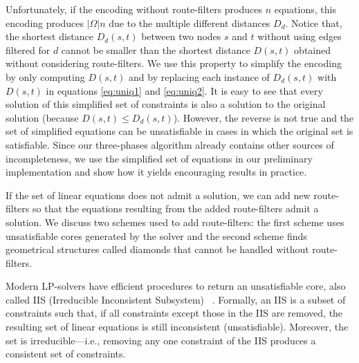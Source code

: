 Unfortunately, if the encoding without route-filters produces $n$ equations, this encoding produces $|\Omega|n$ due
to the multiple different distances $D_d$.
Notice that, the shortest distance $D_d(s,t)$ between two nodes $s$ and $t$ without using edges filtered for $d$ cannot be
smaller than the shortest distance $D(s,t)$ obtained without considering route-filters.
We use this property to simplify the encoding by only computing $D(s,t)$ and by replacing each instance of $D_d(s,t)$
with $D(s,t)$ in
equations \eqref{eq:uniq1} and \eqref{eq:uniq2}. 
It is easy to see that every solution of this simplified set of constraints
is also a solution to the original solution (because $D(s,t)\leq D_d(s,t)$).
However, the reverse is not true and the set of simplified equations can be unsatisfiable
in cases in which the original set is satisfiable.
Since our three-phases algorithm already contains other sources of incompleteness, we use the simplified
set of equations in our preliminary implementation and show how it yields encouraging results in practice.

If the set of linear equations does not admit a solution, we 
can add new route-filters so that the equations resulting from the added
route-filters admit a solution.
We discuss two schemes used to add route-filters:
the first scheme uses unsatisfiable cores generated
by the solver and the second scheme 
finds geometrical structures called diamonds that 
cannot be handled without route-filters.



Modern LP-solvers have efficient procedures to return an
unsatisfiable core, also called IIS (Irreducible Inconsistent Subsystem)
~\cite{chinneck2007feasibility}. Formally, an IIS is a subset of constraints such that,
if all constraints except those in the IIS are removed, the resulting set of
linear equations is still inconsistent (unsatisfiable). Moreover, the set is irreducible---i.e., removing 
any one constraint of the IIS produces a consistent set of constraints. 

